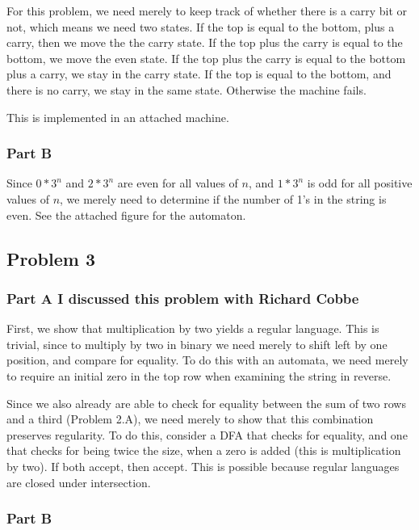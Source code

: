 \documentclass[12pt]
{article}
\begin{document}
For this problem, we need merely to keep track of whether there is a
carry bit or not, which means we need two states.  If the top is equal
to the bottom, plus a carry, then we move the the carry state.  If the
top plus the carry is equal to the bottom, we move the even state.  If
the top plus the carry is equal to the bottom plus a carry, we stay in
the carry state.  If the top is equal to the bottom, and there is no
carry, we stay in the same state.  Otherwise the machine fails.  

This is implemented in an attached machine.  

\subsubsection*{Part B}
Since $0 * 3^n$ and $2 * 3^n$ are even for all values of $n$, and $1 *
3^n$ is odd for all positive values of $n$, we merely need to
determine if the number of 1's in the string is even.  See the
attached figure for the automaton.  

\subsection*{Problem 3}

\subsubsection*{Part A \small{I discussed this problem with Richard Cobbe}}

First, we show that multiplication by two yields a regular language.
This is trivial, since to multiply by two in binary we need merely to
shift left by one position, and compare for equality.  To do this with
an automata, we need merely to require an initial zero in the top row
when examining the string in reverse.  

Since we also already are able to check for equality between the sum
of two rows and a third (Problem 2.A), we need merely to show that this combination
preserves regularity. To do this, consider a DFA that checks for
equality, and one that checks for being twice the size, when a zero is
added (this is multiplication by two).  If both accept, then accept.
This is possible because regular languages are closed under
intersection. 

\subsubsection*{Part B}
\end{document}
